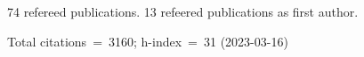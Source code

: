 74 refereed publications. 13 refeered publications as first author.

Total citations~=~3160; h-index~=~31 (2023-03-16)